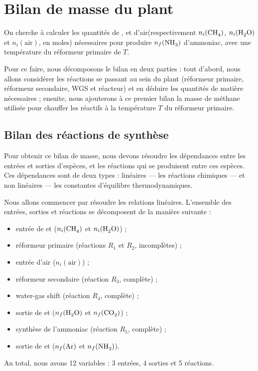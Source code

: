 \section{Bilan de masse du plant}

On cherche à calculer les quantités de ,  et d'air\footnotemark (respectivement $n_i(\ce{CH4})$, $n_i(\ce{H2O})$ et $n_i(\text{air})$, en moles) nécessaires pour produire $n_f(\ce{NH3})$\;\mole{} d'ammoniac, avec une température du réformeur primaire de $T$\;\kelvin{}.

Pour ce faire, nous décomposons le bilan en deux parties : tout d'abord, nous allons considérer les réactions se passant au sein du plant (réformeur primaire, réformeur secondaire, WGS et réacteur) et en déduire les quantités de matière nécessaires ; ensuite, nous ajouterons à ce premier bilan la masse de méthane utilisée pour chauffer les réactifs à la température $T$ du réformeur primaire.


\subsection{Bilan des réactions de synthèse}

Pour obtenir ce bilan de masse, nous devons résoudre les dépendances entre les entrées et sorties d'espèces, et les réactions qui se produisent entre ces espèces. Ces dépendances sont de deux types : linéaires --- les réactions chimiques --- et non linéaires --- les constantes d'équilibre thermodynamiques.

Nous allons commencer par résoudre les relations linéaires. L'ensemble des entrées, sorties et réactions se décomposent de la manière suivante :
\begin{itemize}
  \item entrée de  et  ($n_i(\ce{CH4})$ et $n_i(\ce{H2O})$) ;
  \item réformeur primaire (réactions $R_1$ et $R_2$, incomplètes) ;
  \item entrée d'air ($n_i(\text{air})$) ;
  \item réformeur secondaire (réaction $R_3$, complète) ;
  \item water-gas shift (réaction $R_4$, complète) ;
  \item sortie de  et  ($n_f(\ce{H2O})$ et $n_f(\ce{CO2})$) ;
  \item synthèse de l'ammoniac (réaction $R_5$, complète) ;
  \item sortie de  et  ($n_f(\ce{Ar})$ et $n_f(\ce{NH3})$).
\end{itemize}
Au total, nous avons 12 variables : 3 entrées, 4 sorties et 5 réactions.

